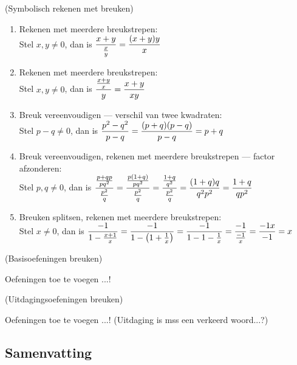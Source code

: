 \documentclass[numbers]{ximera}
\begin{document}
\begin{example} (Symbolisch rekenen met breuken)

	\begin{enumerate}
		\item Rekenen met meerdere breukstrepen:\\
		Stel $x,y \neq 0$, dan is $\displaystyle{\frac{x+y}{\frac{x}{y}}=\frac{(x+y)y}{x}}$
		\item Rekenen met meerdere breukstrepen:\\
		Stel $x,y \neq 0$, dan is $\ds{\frac{\frac{x+y}{x}}{\ y\ }=\frac{x+y}{xy}}$
		\item Breuk vereenvoudigen --- verschil van twee kwadraten:\\
		Stel $p-q \neq 0$, dan is $\displaystyle{\frac{p^{2}-q^{2}}{p-q}=\frac{(p+q)(p-q)}{p-q}=p+q}$
		\item Breuk vereenvoudigen, rekenen met meerdere breukstrepen --- factor afzonderen:\\
		Stel $p,q \neq 0$, dan is $\displaystyle{\frac{\frac{p+qp}{pq^{2}}}{\frac{p^{2}}{q}}=\frac{\frac{p(1+q)}{pq^{2}}}{\frac{p^{2}}{q}}=
			\frac{\frac{1+q}{q^{2}}}{\frac{p^{2}}{q}}=\frac{(1+q)q}{q^{2}p^2}=\frac{1+q}{qp^{2}}}$
		\item Breuken splitsen, rekenen met meerdere breukstrepen:\\
		Stel $x \neq 0$, dan is $\displaystyle{\frac{-1}{1-\frac{x+1}{x}}=\frac{-1}{1-\left(1+\frac{1}{x}\right)}=\frac{-1}{1-1-\frac{1}{x}}=\frac{-1}{\frac{-1}{x}}=\frac{-1x}{-1}=x}$
	\end{enumerate}
\end{example}

\begin{exercise} (Basisoefeningen breuken)\ 
	
    Oefeningen toe te voegen ...!
\end{exercise}

\begin{exercise} (Uitdagingsoefeningen breuken)\ 
	
	Oefeningen toe te voegen ...! (Uitdaging is mss een verkeerd woord...?)
\end{exercise}


\subsection{Samenvatting}
\end{document}
